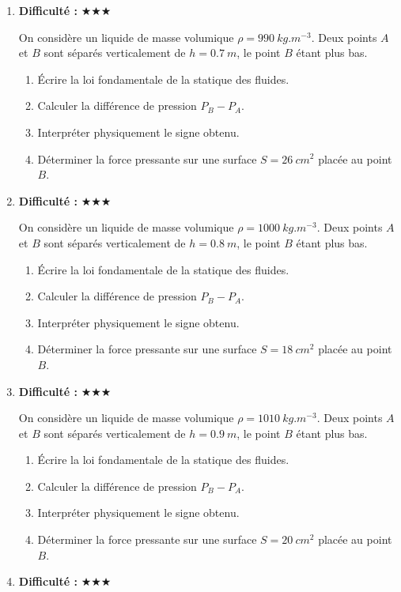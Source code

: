 \documentclass[11pt,a4paper]{article}
\newcommand{\etoiles}[1]{\textbf{Difficulté : }#1}
\begin{document}
\begin{enumerate}[label=\textbf{Exercice \arabic*.},leftmargin=*]
On considère un liquide de masse volumique $\rho=980\ \si{kg.m^{-3}}$.
Deux points $A$ et $B$ sont séparés verticalement de $h=0.6\ \si{m}$, le point $B$ étant plus bas.
\begin{enumerate}[label=\alph*)]
\item Écrire la loi fondamentale de la statique des fluides.
\item Calculer la différence de pression $P_B-P_A$.
\item Interpréter physiquement le signe obtenu.
\item Déterminer la force pressante sur une surface $S=24\ \si{cm^2}$ placée au point $B$.
\end{enumerate}
\item \etoiles{★★★}

On considère un liquide de masse volumique $\rho=990\ \si{kg.m^{-3}}$.
Deux points $A$ et $B$ sont séparés verticalement de $h=0.7\ \si{m}$, le point $B$ étant plus bas.
\begin{enumerate}[label=\alph*)]
\item Écrire la loi fondamentale de la statique des fluides.
\item Calculer la différence de pression $P_B-P_A$.
\item Interpréter physiquement le signe obtenu.
\item Déterminer la force pressante sur une surface $S=26\ \si{cm^2}$ placée au point $B$.
\end{enumerate}
\item \etoiles{★★★}

On considère un liquide de masse volumique $\rho=1000\ \si{kg.m^{-3}}$.
Deux points $A$ et $B$ sont séparés verticalement de $h=0.8\ \si{m}$, le point $B$ étant plus bas.
\begin{enumerate}[label=\alph*)]
\item Écrire la loi fondamentale de la statique des fluides.
\item Calculer la différence de pression $P_B-P_A$.
\item Interpréter physiquement le signe obtenu.
\item Déterminer la force pressante sur une surface $S=18\ \si{cm^2}$ placée au point $B$.
\end{enumerate}
\item \etoiles{★★★}

On considère un liquide de masse volumique $\rho=1010\ \si{kg.m^{-3}}$.
Deux points $A$ et $B$ sont séparés verticalement de $h=0.9\ \si{m}$, le point $B$ étant plus bas.
\begin{enumerate}[label=\alph*)]
\item Écrire la loi fondamentale de la statique des fluides.
\item Calculer la différence de pression $P_B-P_A$.
\item Interpréter physiquement le signe obtenu.
\item Déterminer la force pressante sur une surface $S=20\ \si{cm^2}$ placée au point $B$.
\end{enumerate}
\item \etoiles{★★★}


\end{enumerate}
\end{document}
